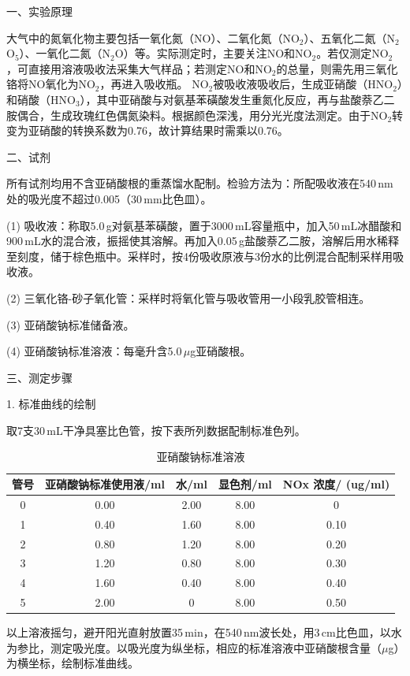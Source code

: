 \documentclass[12pt,hyperref,a4paper,UTF8]{ctexart}
\begin{document}
一、实验原理

大气中的氮氧化物主要包括一氧化氮（NO）、二氧化氮（NO$_2$）、五氧化二氮（N$_2$O$_5$）、一氧化二氮（N$_2$O）等。实际测定时，主要关注NO和NO$_2$。若仅测定NO$_2$，可直接用溶液吸收法采集大气样品；若测定NO和NO$_2$的总量，则需先用三氧化铬将NO氧化为NO$_2$，再进入吸收瓶。
NO$_2$被吸收液吸收后，生成亚硝酸（HNO$_2$）和硝酸（HNO$_3$），其中亚硝酸与对氨基苯磺酸发生重氮化反应，再与盐酸萘乙二胺偶合，生成玫瑰红色偶氮染料。根据颜色深浅，用分光光度法测定。由于NO$_2$转变为亚硝酸的转换系数为0.76，故计算结果时需乘以0.76。

二、试剂

所有试剂均用不含亚硝酸根的重蒸馏水配制。检验方法为：所配吸收液在540\,nm处的吸光度不超过0.005（30\,mm比色皿）。

(1) 吸收液：称取5.0\,g对氨基苯磺酸，置于3000\,mL容量瓶中，加入50\,mL冰醋酸和900\,mL水的混合液，振摇使其溶解。再加入0.05\,g盐酸萘乙二胺，溶解后用水稀释至刻度，储于棕色瓶中。采样时，按4份吸收原液与3份水的比例混合配制采样用吸收液。

(2) 三氧化铬-砂子氧化管：采样时将氧化管与吸收管用一小段乳胶管相连。

(3) 亚硝酸钠标准储备液。

(4) 亚硝酸钠标准溶液：每毫升含5.0\,$\mu$g亚硝酸根。

三、测定步骤

1. 标准曲线的绘制

取7支30\,mL干净具塞比色管，按下表所列数据配制标准色列。

\begin{table}[h]
\centering
\caption{亚硝酸钠标准溶液}
\label{tab:experiment_data2}
\begin{tabular}{@{}ccccc@{}}
\toprule
管号 & 亚硝酸钠标准使用液/ml & 水/ml & 显色剂/ml & NOx 浓度/ (ug/ml) \\
\midrule
0 & 0.00 & 2.00 & 8.00 & 0 \\
1 & 0.40 & 1.60 & 8.00 & 0.10 \\
2 & 0.80 & 1.20 & 8.00 & 0.20 \\
3 & 1.20 & 0.80 & 8.00 & 0.30 \\
4 & 1.60 & 0.40 & 8.00 & 0.40 \\
5 & 2.00 & 0 & 8.00 & 0.50 \\
\bottomrule
\end{tabular}
\end{table}


以上溶液摇匀，避开阳光直射放置35\,min，在540\,nm波长处，用3\,cm比色皿，以水为参比，测定吸光度。以吸光度为纵坐标，相应的标准溶液中亚硝酸根含量（$\mu$g）为横坐标，绘制标准曲线。
\end{document}
